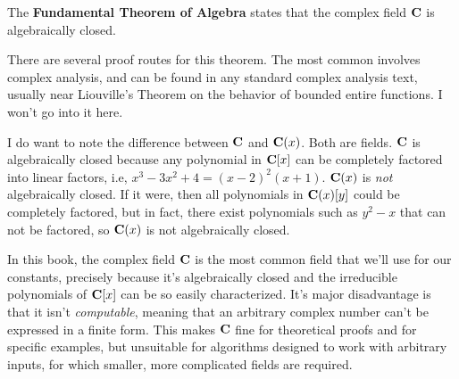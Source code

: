 \begin{key point}
The {\bf Fundamental Theorem of
Algebra} states that the complex field ${\bf C}$ is algebraically
closed.
\end{key point}

There are several proof routes for this theorem.  The most
common involves complex analysis, and can be found in any standard
complex analysis text, usually near Liouville's Theorem on the
behavior of bounded entire functions.  I won't go into it here.

I do want to note the difference between ${\bf C}$ and ${\bf C}(x)$.
Both are fields.  ${\bf C}$ is algebraically closed because any
polynomial in ${\bf C}[x]$ can be completely factored into linear
factors, i.e, $x^3-3x^2+4=(x-2)^2(x+1)$.  ${\bf C}(x)$ is {\it not} algebraically closed.
If it were, then all polynomials in ${\bf C}(x)[y]$ could
be completely factored, but in fact, there exist polynomials
such as $y^2-x$ that can not be factored, so ${\bf C}(x)$
is not algebraically closed.

In this book, the complex field ${\bf C}$ is the most common field
that we'll use for our constants, precisely because it's algebraically
closed and the irreducible polynomials of ${\bf C}[x]$ can be so
easily characterized.  It's major disadvantage is that it isn't {\it
computable}, meaning that an arbitrary complex number can't be
expressed in a finite form.  This makes ${\bf C}$ fine for theoretical
proofs and for specific examples, but unsuitable for algorithms
designed to work with arbitrary inputs, for which smaller,
more complicated fields are required.

